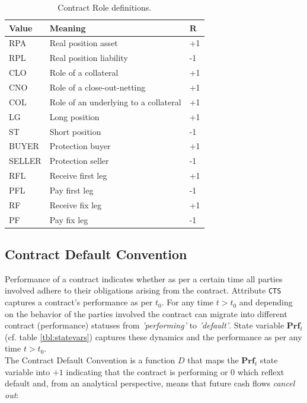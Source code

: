 \documentclass[9pt,oneside]{amsart}
\newcommand{\svar}[2]{\textbf{#1}_{#2}}
\newcommand{\attr}[1]{\texttt{#1}}
\begin{document}
\begin{multicols}{2}
\begin{table}[H]
	\centering
	\begin{tabular}{| p{0.5in}p{1.5in}p{0.2in} |}
	\hline
	\textbf{Value} & \textbf{Meaning} & $\textbf{R}$ \\
	\hline
	RPA & Real position asset & +1 \\
	\hline
	RPL & Real position liability & -1 \\
	\hline
	CLO & Role of a collateral & +1 \\
	\hline
	CNO & Role of a close-out-netting & +1 \\
	\hline
	COL & Role of an underlying to a collateral & +1 \\
	\hline
	LG & Long position & +1 \\
	\hline
	ST & Short position & -1 \\
	\hline
	BUYER & Protection buyer & +1 \\
	\hline
	SELLER & Protection seller & -1 \\
	\hline
	RFL & Receive first leg & +1 \\
	\hline
	PFL & Pay first leg & -1 \\
	\hline
	RF & Receive fix leg & +1 \\
	\hline
	PF & Pay fix leg & -1 \\
	\hline
	\end{tabular}
	\caption{Contract Role definitions.}
	\label{tbl:cntrl}
\end{table}


\subsection{Contract Default Convention}\label{sec:default}

Performance of a contract indicates whether as per a certain time all parties involved adhere to their obligations arising from the contract. Attribute \attr{CTS} captures a contract's performance as per $t_0$. For any time $t>t_0$ and depending on the behavior of the parties involved the contract can migrate into different contract (performance) statuses from \textit{'performing'} to \textit{'default'}. State variable $\svar{Prf}{t}$ (cf. table \ref{tbl:statevars}) captures these dynamics and the performance as per any time $t>t_0$.\\

The Contract Default Convention is a function $D$ that maps the $\svar{Prf}{t}$ state variable into $+1$ indicating that the contract is performing or $0$ which reflext default and, from an analytical perspective, means that future cash flows \textit{cancel out}:


\end{multicols}
\end{document}
